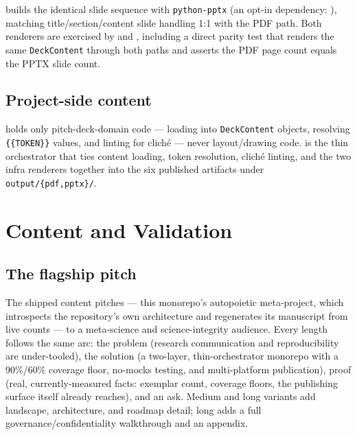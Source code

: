 \documentclass[
]{article}
\begin{document}
 builds the
identical slide sequence with \texttt{python-pptx} (an opt-in
dependency: ), matching
title/section/content slide handling 1:1 with the PDF path. Both
renderers are exercised by
 and
, including a direct parity test that
renders the same \texttt{DeckContent} through both paths and asserts the
PDF page count equals the PPTX slide count.

\subsection{Project-side content}\label{project-side-content}

 holds only
pitch-deck-domain code --- loading
 into \texttt{DeckContent}
objects, resolving \texttt{\{\{TOKEN\}\}} values, and linting for cliché
--- never layout/drawing code.  is the
thin orchestrator that ties content loading, token resolution, cliché
linting, and the two infra renderers together into the six published
artifacts under \texttt{output/\{pdf,pptx\}/}.

\newpage

\section{Content and Validation}\label{sec:validation}

\subsection{The flagship pitch}\label{the-flagship-pitch}

The shipped content pitches
\href{../../template_template/}{} --- this
monorepo's autopoietic meta-project, which introspects the repository's
own architecture and regenerates its manuscript from live counts --- to
a meta-science and science-integrity audience. Every length follows the
same arc: the problem (research communication and reproducibility are
under-tooled), the solution (a two-layer, thin-orchestrator monorepo
with a 90\%/60\% coverage floor, no-mocks testing, and multi-platform
publication), proof (real, currently-measured facts: exemplar count,
coverage floors, the publishing surface 
itself already reaches), and an ask. Medium and long variants add
landscape, architecture, and roadmap detail; long adds a full
governance/confidentiality walkthrough and an appendix.
\end{document}
